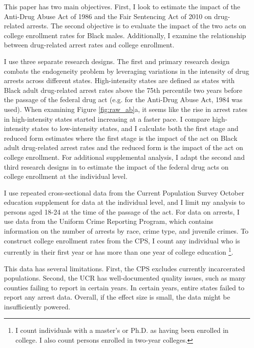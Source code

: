 \documentclass{article}
\begin{document}

This paper has two main objectives. First, I look to estimate the impact of the Anti-Drug Abuse Act of 1986 and the Fair Sentencing Act of 2010 on drug-related arrests. The second objective is to evaluate the impact of the two acts on college enrollment rates for Black males. Additionally, I examine the relationship between drug-related arrest rates and college enrollment. 


I use three separate research designs. The first and primary research design combats the endogeneity problem by leveraging variations in the intensity of drug arrests across different states. High-intensity states are defined as states with Black adult drug-related arrest rates above the 75th percentile two years before the passage of the federal drug act (e.g. for the Anti-Drug Abuse Act, 1984 was used). When examining Figure \ref{fig:raw_ab}a, it seems like the rise in arrest rates in high-intensity states started increasing at a faster pace. I compare high-intensity states to low-intensity states, and I calculate both the first stage and reduced form estimates where the first stage is the impact of the act on Black adult drug-related arrest rates and the reduced form is the impact of the act on college enrollment. For additional supplemental analysis, I adapt the second and third research designs in \cite{britton2022} to estimate the impact of the federal drug acts on college enrollment at the individual level.


I use repeated cross-sectional data from the Current Population Survey October education supplement for data at the individual level, and I limit my analysis to persons aged 18-24 at the time of the passage of the act. For data on arrests, I use data from the Uniform Crime Reporting Program, which contains information on the number of arrests by race, crime type, and juvenile crimes. To construct college enrollment rates from the CPS, I count any individual who is currently in their first year or has more than one year of college education \footnote{I count individuals with a master's or Ph.D. as having been enrolled in college. I also count persons enrolled in two-year colleges.}.

This data has several limitations. First, the CPS excludes currently incarcerated populations. Second, the UCR has well-documented quality issues, such as many counties failing to report in certain years. In certain years, entire states failed to report any arrest data. Overall, if the effect size is small, the data might be insufficiently powered.
\end{document}
